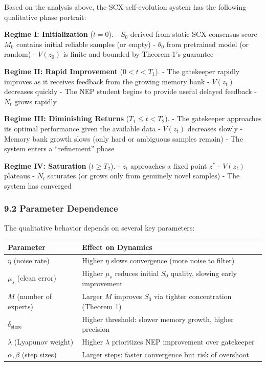 \documentclass[
  12pt,
]{article}
\begin{document}
Based on the analysis above, the SCX self-evolution system has the
following qualitative phase portrait:

\textbf{Regime I: Initialization} (\(t = 0\)). - \(S_0\) derived from
static SCX consensus score - \(M_0\) contains initial reliable samples
(or empty) - \(\theta_0\) from pretrained model (or random) - \(V(z_0)\)
is finite and bounded by Theorem 1's guarantee

\textbf{Regime II: Rapid Improvement} (\(0 < t < T_1\)). - The
gatekeeper rapidly improves as it receives feedback from the growing
memory bank - \(V(z_t)\) decreases quickly - The NEP student begins to
provide useful delayed feedback - \(N_t\) grows rapidly

\textbf{Regime III: Diminishing Returns} (\(T_1 \leq t < T_2\)). - The
gatekeeper approaches its optimal performance given the available data -
\(V(z_t)\) decreases slowly - Memory bank growth slows (only hard or
ambiguous samples remain) - The system enters a ``refinement'' phase

\textbf{Regime IV: Saturation} (\(t \geq T_2\)). - \(z_t\) approaches a
fixed point \(z^*\) - \(V(z_t)\) plateaus - \(N_t\) saturates (or grows
only from genuinely novel samples) - The system has converged

\subsubsection{9.2 Parameter Dependence}\label{parameter-dependence}

The qualitative behavior depends on several key parameters:

\begin{longtable}[]{@{}
  >{\raggedright\arraybackslash}p{}
  >{\raggedright\arraybackslash}p{}@{}}
\toprule\noalign{}
\begin{minipage}[b]{\linewidth}\raggedright
Parameter
\end{minipage} & \begin{minipage}[b]{\linewidth}\raggedright
Effect on Dynamics
\end{minipage} \\
\midrule\noalign{}
\endhead
\bottomrule\noalign{}
\endlastfoot
\(\eta\) (noise rate) & Higher \(\eta\) slows convergence (more noise to
filter) \\
\(\mu_s\) (clean error) & Higher \(\mu_s\) reduces initial \(S_0\)
quality, slowing early improvement \\
\(M\) (number of experts) & Larger \(M\) improves \(S_0\) via tighter
concentration (Theorem 1) \\
\(\delta_{\text{store}}\) & Higher threshold: slower memory growth,
higher precision \\
\(\lambda\) (Lyapunov weight) & Higher \(\lambda\) prioritizes NEP
improvement over gatekeeper \\
\(\alpha, \beta\) (step sizes) & Larger steps: faster convergence but
risk of overshoot \\
\end{longtable}
\end{document}
